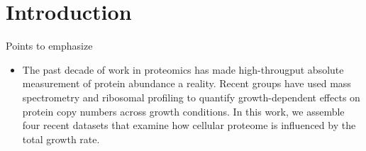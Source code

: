 \section{Introduction}

Points to emphasize
\begin{itemize}
\item The past decade of work in proteomics has made high-througput absolute
measurement of protein abundance a reality. Recent groups have used mass
spectrometry and ribosomal profiling to quantify growth-dependent effects on
protein copy numbers across growth conditions. In this work, we assemble four
recent datasets that examine how cellular proteome is influenced by the total
growth rate. 
\end{itemize}